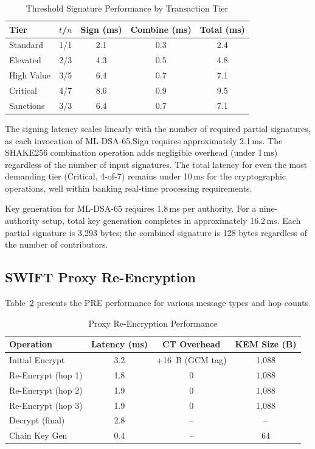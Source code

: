 \documentclass[conference,10pt]{IEEEtran}
\begin{document}
\begin{table}[htbp]
\centering
\caption{Threshold Signature Performance by Transaction Tier}
\label{tab:threshold_perf}
\begin{tabular}{@{}lcccc@{}}
\toprule
\textbf{Tier} & \textbf{$t$/$n$} & \textbf{Sign (ms)} & \textbf{Combine (ms)} & \textbf{Total (ms)} \\
\midrule
Standard  & 1/1 & 2.1 & 0.3 & 2.4 \\
Elevated  & 2/3 & 4.3 & 0.5 & 4.8 \\
High Value & 3/5 & 6.4 & 0.7 & 7.1 \\
Critical  & 4/7 & 8.6 & 0.9 & 9.5 \\
Sanctions & 3/3 & 6.4 & 0.7 & 7.1 \\
\bottomrule
\end{tabular}
\end{table}

The signing latency scales linearly with the number of required partial signatures, as each invocation of ML-DSA-65.Sign requires approximately 2.1\,ms. The SHAKE256 combination operation adds negligible overhead (under 1\,ms) regardless of the number of input signatures. The total latency for even the most demanding tier (Critical, 4-of-7) remains under 10\,ms for the cryptographic operations, well within banking real-time processing requirements.

Key generation for ML-DSA-65 requires 1.8\,ms per authority. For a nine-authority setup, total key generation completes in approximately 16.2\,ms. Each partial signature is 3,293 bytes; the combined signature is 128 bytes regardless of the number of contributors.

\subsection{SWIFT Proxy Re-Encryption}

Table~\ref{tab:pre_perf} presents the PRE performance for various message types and hop counts.

\begin{table}[htbp]
\centering
\caption{Proxy Re-Encryption Performance}
\label{tab:pre_perf}
\begin{tabular}{@{}lccc@{}}
\toprule
\textbf{Operation} & \textbf{Latency (ms)} & \textbf{CT Overhead} & \textbf{KEM Size (B)} \\
\midrule
Initial Encrypt  & 3.2 & +16~B (GCM tag) & 1,088 \\
Re-Encrypt (hop 1) & 1.8 & 0 & 1,088 \\
Re-Encrypt (hop 2) & 1.9 & 0 & 1,088 \\
Re-Encrypt (hop 3) & 1.9 & 0 & 1,088 \\
Decrypt (final)  & 2.8 & -- & -- \\
Chain Key Gen    & 0.4 & -- & 64 \\
\end{tabular}
\end{table}
\end{document}
